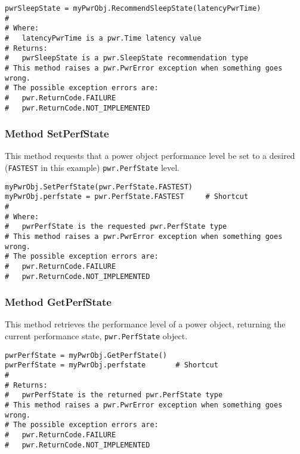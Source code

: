 \documentclass[12pt]{report} %
\begin{document}
\begin{appendices}
\begin{center}\begin{minipage}{.95\linewidth}\begin{lstlisting}
pwrSleepState = myPwrObj.RecommendSleepState(latencyPwrTime) 
#
# Where:
#   latencyPwrTime is a pwr.Time latency value
# Returns:
#   pwrSleepState is a pwr.SleepState recommendation type
# This method raises a pwr.PwrError exception when something goes wrong.
# The possible exception errors are: 
#   pwr.ReturnCode.FAILURE
#   pwr.ReturnCode.NOT_IMPLEMENTED
\end{lstlisting}\end{minipage}\end{center}

\subsubsection{Method SetPerfState} \label{meth:SetPerfState}

This method requests that a power object performance level be set to a desired (\texttt{FASTEST}
in this example) \texttt{pwr.PerfState} level.

\begin{center}\begin{minipage}{.95\linewidth}\begin{lstlisting}
myPwrObj.SetPerfState(pwr.PerfState.FASTEST)
myPwrObj.perfstate = pwr.PerfState.FASTEST     # Shortcut
#
# Where:
#   pwrPerfState is the requested pwr.PerfState type
# This method raises a pwr.PwrError exception when something goes wrong.
# The possible exception errors are: 
#   pwr.ReturnCode.FAILURE
#   pwr.ReturnCode.NOT_IMPLEMENTED
\end{lstlisting}\end{minipage}\end{center}

\subsubsection{Method GetPerfState} \label{meth:GetPerfState}

This method retrieves the performance level of a power object, returning the current
performance state, \texttt{pwr.PerfState} object.

\begin{center}\begin{minipage}{.95\linewidth}\begin{lstlisting}
pwrPerfState = myPwrObj.GetPerfState()
pwrPerfState = myPwrObj.perfstate       # Shortcut
#
# Returns:
#   pwrPerfState is the returned pwr.PerfState type
# This method raises a pwr.PwrError exception when something goes wrong.
# The possible exception errors are: 
#   pwr.ReturnCode.FAILURE
#   pwr.ReturnCode.NOT_IMPLEMENTED
\end{lstlisting}\end{minipage}\end{center}


\end{appendices}
\end{document}
